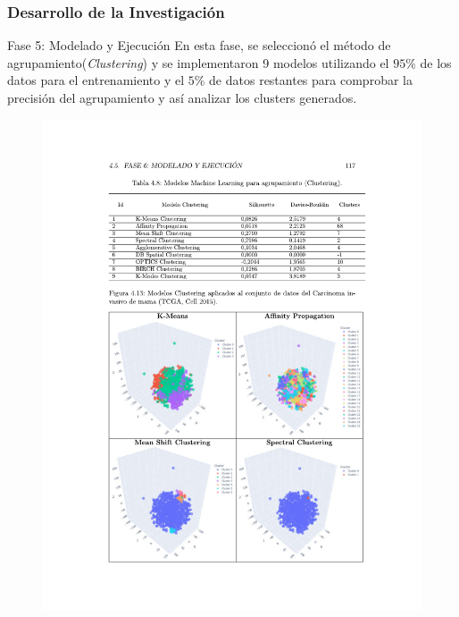 \documentclass[xcolor=dvipsnames,xcolor=table,10pt]{beamer} %
\begin{document}
\begin{frame}
	\frametitle{Desarrollo de la Investigación}
	\begin{block}{Fase 5: Modelado y Ejecución}\justifying
	 En esta fase, se seleccionó el método de agrupamiento(\textit{Clustering}) y se implementaron 9 modelos utilizando el $95\%$ de los datos para el entrenamiento y el $5\%$ de datos restantes para comprobar la precisión del agrupamiento y así analizar los clusters generados.
	\end{block}
	
	\begin{figure}[h!]
		\centering
		\includegraphics[width=0.87\linewidth]{IMAGENES/Clustering_Beamer}
	\end{figure}
\end{frame}
\end{document}
